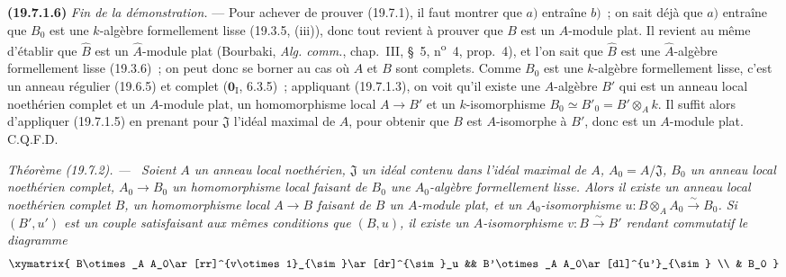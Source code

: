 \documentclass[10pt,oneside]{book}
\makeatletter
\newcommand{\setmanualcurrentlabel}[1]{\def\@currentlabel{#1}}
\newcommand{\oldpage}[2][]{%
  \setcounter{footnote}{0}%
  \marginpar{\scriptsize\textbf{#1}~|~#2}\ignorespaces}
\newenvironment{theorem}[1][]{%
  \setmanualcurrentlabel{#1}\par\medskip\noindent\itshape Théorème (#1). ---\ }{\par}
\makeatother
\begin{document}
\medskip
\noindent\textbf{(19.7.1.6)}\enspace
\emph{Fin de la démonstration.} --- Pour achever de prouver (19.7.1), il faut
montrer que $a)$ entraîne $b)$~; on sait déjà que $a)$ entraîne que $B_0$ est
une $k$-algèbre formellement lisse (19.3.5, (iii)), donc tout revient à prouver
que $B$ est un $A$-module plat. Il revient au même d'établir que $\widehat B$
est un $\widehat A$-module plat (Bourbaki, \emph{Alg. comm.}, chap.~III, §~5,
n\textsuperscript{o}~4, prop.~4), et l'on sait que $\widehat B$ est une
$\widehat A$-algèbre formellement lisse (19.3.6)~; on peut donc se borner au
cas où $A$ et $B$ sont complets. Comme $B_0$ est une $k$-algèbre formellement
lisse, c'est un anneau régulier (19.6.5) et complet
($\mathbf 0_{\mathrm I}$, 6.3.5)~; appliquant (19.7.1.3), on voit qu'il existe
une $A$-algèbre $B'$ qui est un anneau local noethérien complet et un
$A$-module plat, un homomorphisme local $A\to B'$ et un $k$-isomorphisme
$B_0\simeq B'_0=B'\otimes_A k$. Il suffit alors d'appliquer (19.7.1.5) en
prenant pour $\mathfrak J$ l'idéal maximal de $A$, pour obtenir que $B$ est
$A$-isomorphe à $B'$, donc est un $A$-module plat. C.Q.F.D.

\begin{theorem}[19.7.2]
\label{0.19.7.2-fr}
Soient $A$ un anneau local noethérien, $\mathfrak J$ un idéal contenu dans
l'idéal maximal de $A$, $A_0=A/\mathfrak J$, $B_0$ un anneau local noethérien
complet, $A_0\to B_0$ un homomorphisme local faisant de $B_0$ une
$A_0$-algèbre formellement lisse. Alors il existe un anneau local noethérien
complet $B$, un homomorphisme local $A\to B$ faisant de $B$ un $A$-module
plat, et un $A_0$-isomorphisme
$u:B\otimes_A A_0\xrightarrow{\sim}B_0$. Si $(B',u')$ est un couple
satisfaisant aux mêmes conditions que $(B,u)$, il existe un $A$-isomorphisme
$v:B\xrightarrow{\sim}B'$ rendant commutatif le diagramme
\[
\xymatrix{
  B\otimes_A A_0\ar[rr]^{v\otimes1}_{\sim}\ar[dr]^{\sim}_u &&
  B'\otimes_A A_0\ar[dl]^{u'}_{\sim} \\
  & B_0
}
\]
\end{theorem}

\oldpage[0\textsubscript{IV-1}]{109}
\end{document}
